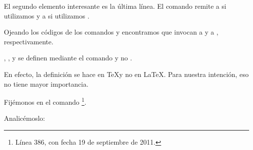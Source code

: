 El segundo elemento interesante es la última línea. El comando  remite a  si utilizamos  y a  si utilizamos .

Ojeando los códigos de los comandos  y  encontramos que invocan a  y a , respectivamente.

\begin{plusloins}
, ,  y  se definen mediante el comando  y no . 

En efecto, la definición se hace en \TeX y no en \LaTeX. Para nuestra intención, eso no tiene mayor importancia.
\end{plusloins} 

Fijémonos en el comando \footnote{Línea 386, con fecha 19 de septiembre de 2011.}.

\begin{latexcode}
\def\@makechapterhead#1{%
  \vspace*{50\p@}%
  {\parindent \z@ \raggedright \normalfont
    \ifnum \c@secnumdepth >\m@ne
      \if@mainmatter
        \huge\bfseries \@chapapp\space \thechapter
        \par\nobreak
        \vskip 20\p@
      \fi
    \fi
    \interlinepenalty\@M
    \Huge \bfseries #1\par\nobreak
    \vskip 40\p@
  }}
\end{latexcode}

Analicémoslo:

